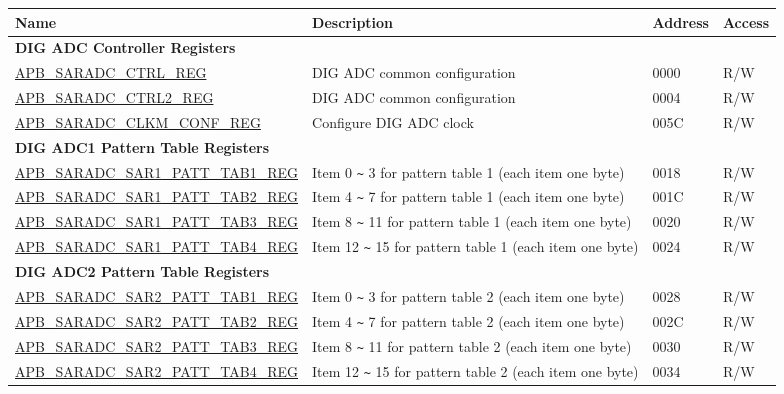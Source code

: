 \begin{longtable}{ | p{6cm} | p{7.2cm} | p{1.3cm} | p{1cm} | }
\hline\rowcolor{lightgray}
Name & Description &  Address & Access \\ \hline
\endhead
\multicolumn{4}{|l|}{\textbf{DIG ADC Controller Registers}} \\ \hline
\hyperref[regdesc:APBSARADCCTRLREG]{APB\_SARADC\_CTRL\_REG} & DIG ADC common configuration & \hexprefix{}0000 & R/W \\ \hline
\hyperref[regdesc:APBSARADCCTRL2REG]{APB\_SARADC\_CTRL2\_REG} & DIG ADC common configuration & \hexprefix{}0004 & R/W \\ \hline
\hyperref[regdesc:APBSARADCCLKMCONFREG]{APB\_SARADC\_CLKM\_CONF\_REG} & Configure DIG ADC clock & \hexprefix{}005C & R/W \\ \hline
\multicolumn{4}{|l|}{\textbf{DIG ADC1 Pattern Table Registers}} \\ \hline
\hyperref[regdesc:APBSARADCSAR1PATTTAB1REG]{APB\_SARADC\_SAR1\_PATT\_TAB1\_REG} & Item 0 \verb+~+ 3 for pattern table 1 (each item one byte) & \hexprefix{}0018 & R/W \\ \hline
\hyperref[regdesc:APBSARADCSAR1PATTTAB2REG]{APB\_SARADC\_SAR1\_PATT\_TAB2\_REG} & Item 4 \verb+~+ 7 for pattern table 1 (each item one byte) & \hexprefix{}001C & R/W \\ \hline
\hyperref[regdesc:APBSARADCSAR1PATTTAB3REG]{APB\_SARADC\_SAR1\_PATT\_TAB3\_REG} & Item 8 \verb+~+ 11 for pattern table 1 (each item one byte) & \hexprefix{}0020 & R/W \\ \hline
\hyperref[regdesc:APBSARADCSAR1PATTTAB4REG]{APB\_SARADC\_SAR1\_PATT\_TAB4\_REG} & Item 12 \verb+~+ 15 for pattern table 1 (each item one byte) & \hexprefix{}0024 & R/W \\ \hline
\multicolumn{4}{|l|}{\textbf{DIG ADC2 Pattern Table Registers}} \\ \hline
\hyperref[regdesc:APBSARADCSAR2PATTTAB1REG]{APB\_SARADC\_SAR2\_PATT\_TAB1\_REG} & Item 0 \verb+~+ 3 for pattern table 2 (each item one byte) & \hexprefix{}0028 & R/W \\ \hline
\hyperref[regdesc:APBSARADCSAR2PATTTAB2REG]{APB\_SARADC\_SAR2\_PATT\_TAB2\_REG} & Item 4 \verb+~+ 7 for pattern table 2 (each item one byte) & \hexprefix{}002C & R/W \\ \hline
\hyperref[regdesc:APBSARADCSAR2PATTTAB3REG]{APB\_SARADC\_SAR2\_PATT\_TAB3\_REG} & Item 8 \verb+~+ 11 for pattern table 2 (each item one byte) & \hexprefix{}0030 & R/W \\ \hline
\hyperref[regdesc:APBSARADCSAR2PATTTAB4REG]{APB\_SARADC\_SAR2\_PATT\_TAB4\_REG} & Item 12 \verb+~+ 15 for pattern table 2 (each item one byte) & \hexprefix{}0034 & R/W \\ \hline

\end{longtable}
